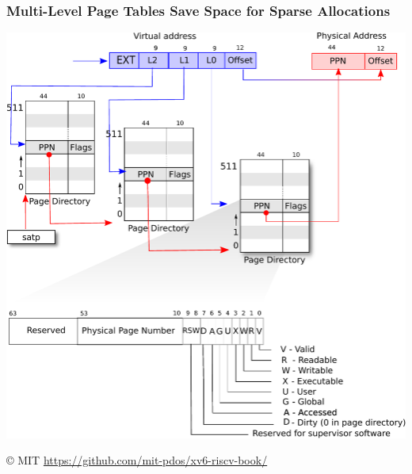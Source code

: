  \begin{frame}
    \frametitle{Multi-Level Page Tables Save Space for Sparse Allocations}

    \begin{center}
      \includegraphics[scale=0.5, clip, trim=0cm 8cm 0cm 0cm]{riscv_pagetable.pdf}
    \end{center}

    © MIT \url{https://github.com/mit-pdos/xv6-riscv-book/}
  \end{frame}


